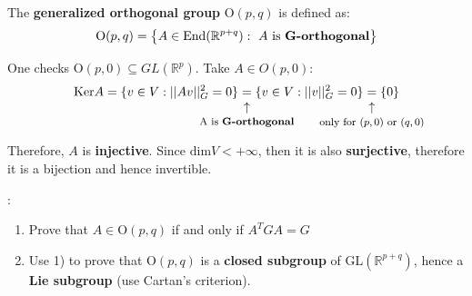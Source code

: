 \documentclass[../main.tex]{subfiles}
\begin{document}
\begin{definition}
The \textbf{generalized orthogonal group} $\textrm{O}(p,q)$ is defined as:
\[
\textrm{O}(p,q)=\Bqty{A\in \textrm{End}(\mathbb{R}^{p+q}):\ A \textrm{ is \textbf{G-orthogonal}}}
\]
\end{definition}
One checks $\textrm{O}(p,0)\subseteq GL(\mathbb{R}^p)$. Take $A\in O(p,0)$:
\[
\text{Ker}A=\{v\in V:||Av||_G^2=0\}\underset{\mathclap{\tikz \node {$\uparrow$} node [below=1ex] {\footnotesize A is \textbf{G-orthogonal} };}}=\{v\in V:||v||_G^2=0\}\underset{\mathclap{\tikz \node {$\uparrow$} node [below=1ex] {\footnotesize only for $(p,0)$ or $(q,0)$ };}}=\{0\}
\]
Therefore, $A$ is \textbf{injective}. Since $\text{dim}V<+\infty$, then it is also \textbf{surjective}, therefore it is a bijection and hence invertible.
\begin{starredExercise}:
\begin{enumerate}
    \item Prove that $A\in \textrm{O}(p,q)$ if and only if {\color{red}$A^TGA=G$}
    \item Use 1) to prove that $\textrm{O}(p,q)$ is a \textbf{closed subgroup} of $\textrm{GL}(\mathbb{R}^{p+q})$, hence a \textbf{Lie subgroup} (use Cartan's criterion).
\end{enumerate}
\end{starredExercise}
\end{document}
